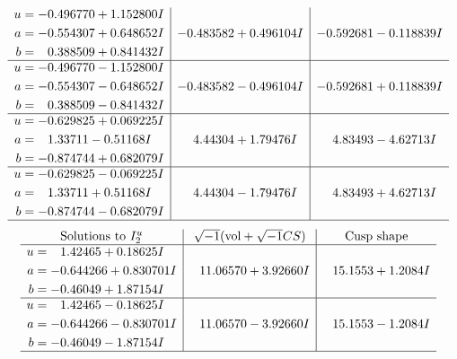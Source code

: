 \documentclass[1p]{elsarticle_modified}
\theoremstyle{definition}
\newcommand{\I}{\sqrt{-1}}
\begin{document}
$$\begin{array}{c|c|c}
\begin{aligned}
u &= -0.496770 + 1.152800 I \\
a &= -0.554307 + 0.648652 I \\
b &= \phantom{-}0.388509 + 0.841432 I\end{aligned}
 & -0.483582 + 0.496104 I & -0.592681 - 0.118839 I \\ \hline\begin{aligned}
u &= -0.496770 - 1.152800 I \\
a &= -0.554307 - 0.648652 I \\
b &= \phantom{-}0.388509 - 0.841432 I\end{aligned}
 & -0.483582 - 0.496104 I & -0.592681 + 0.118839 I \\ \hline\begin{aligned}
u &= -0.629825 + 0.069225 I \\
a &= \phantom{-}1.33711 - 0.51168 I \\
b &= -0.874744 + 0.682079 I\end{aligned}
 & \phantom{-}4.44304 + 1.79476 I & \phantom{-}4.83493 - 4.62713 I \\ \hline\begin{aligned}
u &= -0.629825 - 0.069225 I \\
a &= \phantom{-}1.33711 + 0.51168 I \\
b &= -0.874744 - 0.682079 I\end{aligned}
 & \phantom{-}4.44304 - 1.79476 I & \phantom{-}4.83493 + 4.62713 I\\
 \hline 
 \end{array}$$\newpage$$\begin{array}{c|c|c}  
\text{Solutions to }I^u_{2}& \I (\text{vol} + \sqrt{-1}CS) & \text{Cusp shape}\\
 \hline 
\begin{aligned}
u &= \phantom{-}1.42465 + 0.18625 I \\
a &= -0.644266 + 0.830701 I \\
b &= -0.46049 + 1.87154 I\end{aligned}
 & \phantom{-}11.06570 + 3.92660 I & \phantom{-}15.1553 + 1.2084 I \\ \hline\begin{aligned}
u &= \phantom{-}1.42465 - 0.18625 I \\
a &= -0.644266 - 0.830701 I \\
b &= -0.46049 - 1.87154 I\end{aligned}
 & \phantom{-}11.06570 - 3.92660 I & \phantom{-}15.1553 - 1.2084 I\\
 \hline 
 \end{array}$$\newpage\newpage\renewcommand{\arraystretch}{1}
\end{document}
